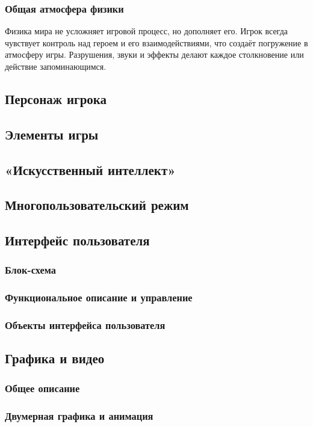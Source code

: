 \documentclass[12pt]{article}
\begin{document}
        
        \subsubsection{Общая атмосфера физики}
        
        Физика мира не усложняет игровой процесс, но дополняет его. Игрок всегда чувствует контроль над героем и его взаимодействиями, что создаёт погружение в атмосферу игры. Разрушения, звуки и эффекты делают каждое столкновение или действие запоминающимся.

    \subsection{Персонаж игрока}
    \subsection{Элементы игры}
    \subsection{«Искусственный интеллект»}
    \subsection{Многопользовательский режим}
    \subsection{Интерфейс пользователя}
        \subsubsection{Блок-схема}
        \subsubsection{Функциональное описание и управление}
        \subsubsection{Объекты интерфейса пользователя}
    \subsection{Графика и видео}
        \subsubsection{Общее описание}
        \subsubsection{Двумерная графика и анимация}
\end{document}
